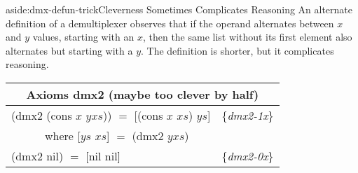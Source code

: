 \begin{aside}{aside:dmx-defun-trick}{Cleverness Sometimes Complicates Reasoning}
An alternate definition of a demultiplexer
observes that if the operand alternates between $x$ and $y$ values,
starting with an $x$,
then the same list without its first element also alternates
but starting with a $y$. The definition is shorter,
but it complicates reasoning.

\begin{center}
\begin{tabular}{ll}
\multicolumn{2}{c}{Axioms \textsf{dmx2} (maybe too clever by half)}\\
\hline
\textsf{(dmx2 (cons $x$ $yxs$)) $=$ [(cons $x$ $xs$) $ys$]}& \{\emph{dmx2-1x}\} \\
~~~~~~where \textsf{[$ys$ $xs$] $=$ (dmx2 $yxs$)}          & \\
\textsf{(dmx2 nil) $=$ [nil nil] }                         & \{\emph{dmx2-0x}\} \\
\end{tabular}
\end{center}
\end{aside}


